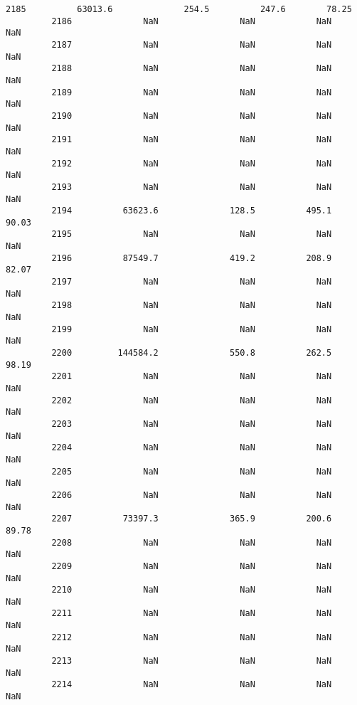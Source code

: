 \documentclass[11pt]{llncs}
\begin{document}
\begin{Verbatim}[commandchars=\\\{\}]
         2185          63013.6              254.5          247.6        78.25   
         2186              NaN                NaN            NaN          NaN   
         2187              NaN                NaN            NaN          NaN   
         2188              NaN                NaN            NaN          NaN   
         2189              NaN                NaN            NaN          NaN   
         2190              NaN                NaN            NaN          NaN   
         2191              NaN                NaN            NaN          NaN   
         2192              NaN                NaN            NaN          NaN   
         2193              NaN                NaN            NaN          NaN   
         2194          63623.6              128.5          495.1        90.03   
         2195              NaN                NaN            NaN          NaN   
         2196          87549.7              419.2          208.9        82.07   
         2197              NaN                NaN            NaN          NaN   
         2198              NaN                NaN            NaN          NaN   
         2199              NaN                NaN            NaN          NaN   
         2200         144584.2              550.8          262.5        98.19   
         2201              NaN                NaN            NaN          NaN   
         2202              NaN                NaN            NaN          NaN   
         2203              NaN                NaN            NaN          NaN   
         2204              NaN                NaN            NaN          NaN   
         2205              NaN                NaN            NaN          NaN   
         2206              NaN                NaN            NaN          NaN   
         2207          73397.3              365.9          200.6        89.78   
         2208              NaN                NaN            NaN          NaN   
         2209              NaN                NaN            NaN          NaN   
         2210              NaN                NaN            NaN          NaN   
         2211              NaN                NaN            NaN          NaN   
         2212              NaN                NaN            NaN          NaN   
         2213              NaN                NaN            NaN          NaN   
         2214              NaN                NaN            NaN          NaN   
         

\end{Verbatim}
\end{document}
